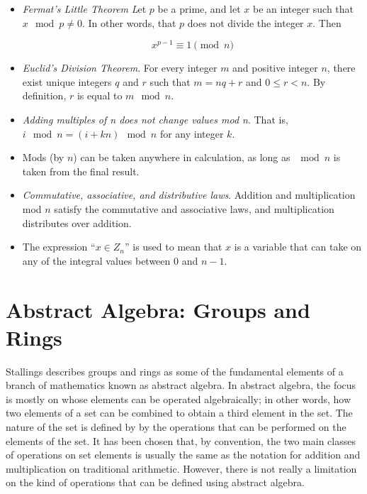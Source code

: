 \begin{itemize}
\item \textit{Fermat's Little Theorem}
\textit Let $p$ be a prime, and let $x$ be an integer such that $x \mod p \ne 0$. In other words, that $p$ does not divide the integer $x$. Then

\begin{equation}
x^{p-1} \equiv 1 \pmod{n}
\end{equation}

\item \textit{Euclid's Division Theorem}. For every integer $m$ and positive integer $n$, there exist unique integers $q$ and $r$ such that $m=nq+r$ and $0 \leq r < n$. By definition, $r$ is equal to $m \mod n$.

\item \textit{Adding multiples of n does not change values mod n}. That is, $i \mod n= (i+kn) \mod n$ for any integer $k$.

\item Mods (by $n$) can be taken anywhere in calculation, as long as $\mod n$ is taken from the final result.

\item \textit{Commutative, associative, and distributive laws}. Addition and multiplication mod $n$ satisfy the commutative and associative laws, and multiplication distributes over addition.

\item The expression ``$x \in Z_{n}$'' is used to mean that $x$ is a variable that can take on any of the integral values between 0 and $n-1$.
\end{itemize}

\section{Abstract Algebra: Groups and Rings}

Stallings \cite{CryptoStallings} describes groups and rings as some of the fundamental elements of a branch of mathematics known as abstract algebra. In abstract algebra, the focus is mostly on whose elements can be operated algebraically; in other words, how two elements of a set can be combined to obtain a third element in the set. The nature of the set is defined by by the operations that can be performed on the elements of the set. It has been chosen that, by convention, the two main classes of operations on set elements is usually the same as the notation for addition and multiplication on traditional arithmetic. However, there is not really a limitation on the kind of operations that can be defined using abstract algebra.

